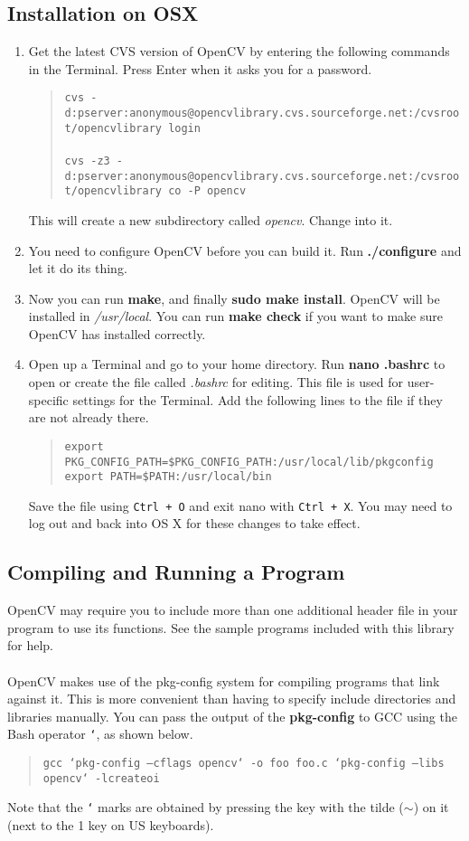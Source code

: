 \documentclass {article}
\begin{document}
\subsection {Installation on OSX}
\begin {enumerate}
  \item Get the latest CVS version of OpenCV by entering the following commands in the Terminal.  Press
        Enter when it asks you for a password.
        \begin {quote}
          {\tt cvs -d:pserver:anonymous@opencvlibrary.cvs.sourceforge.net:/cvsroot/opencvlibrary
            login}\\ \\ 
          {\tt cvs -z3 -d:pserver:anonymous@opencvlibrary.cvs.sourceforge.net:/cvsroot/opencvlibrary
            co -P opencv}
        \end {quote}
        This will create a new subdirectory called {\it opencv}.  Change into it.
  \item You need to configure OpenCV before you can build it.  Run {\bf ./configure}
        and let it do its thing.
  \item Now you can run {\bf make}, and finally {\bf sudo make install}.  OpenCV will be installed
        in {\it /usr/local}.  You can run {\bf make check} if you want to make sure OpenCV has
        installed correctly.
  \item Open up a Terminal and go to your home directory.  Run {\bf nano .bashrc} to open or create
        the file called {\it .bashrc} for editing.  This file is used for user-specific settings for
        the Terminal.  Add the following lines to the file if they are not already there.
        \begin {quote}
          {\tt export PKG\_CONFIG\_PATH=\$PKG\_CONFIG\_PATH:/usr/local/lib/pkgconfig} \\
          {\tt export PATH=\$PATH:/usr/local/bin}
        \end {quote}
        Save the file using {\tt Ctrl + O} and exit nano with {\tt Ctrl + X}.  You may need to log
        out and back into OS X for these changes to take effect.
\end {enumerate}

\subsection {Compiling and Running a Program}
OpenCV may require you to include more than one additional header file in your program to use its
functions.  See the sample programs included with this library for help. \\
\\
OpenCV makes use of the pkg-config system for compiling programs that link against it.  This is more
convenient than having to specify include directories and libraries manually.  You can pass the
output of the {\bf pkg-config} to GCC using the Bash operator {\tt `}, as shown below.

\begin {quote}
  {\tt gcc `pkg-config --cflags opencv` -o foo foo.c `pkg-config --libs opencv` -lcreateoi}
\end {quote}

Note that the {\tt `} marks are obtained by pressing the key with the tilde ($\sim$) on it (next to
the 1 key on US keyboards).
\end{document}
